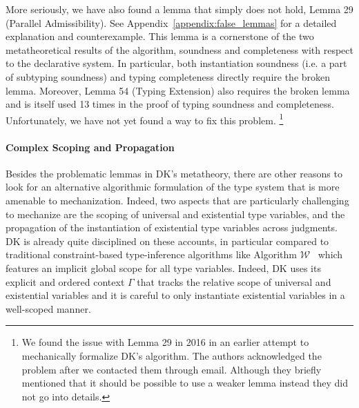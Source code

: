 
More seriously, we have also found a lemma that simply does not hold, 
Lemma 29 (Parallel Admissibility).
See Appendix~\ref{appendix:false_lemmas} for a detailed explanation
and counterexample. This lemma is a cornerstone of the two metatheoretical results 
of the algorithm, soundness and completeness with respect to the declarative system.
In particular, both instantiation soundness (i.e. a part of subtyping
soundness) and typing completeness directly require the broken lemma.
Moreover, Lemma 54 (Typing Extension) also requires the broken lemma and is
itself used 13 times in the proof of typing soundness and completeness.
Unfortunately, we have not yet found a way to fix this problem.
\footnote{We found the issue with Lemma 29 in 2016 in an earlier attempt to mechanically
  formalize DK's algorithm. The authors acknowledged the problem after we contacted them through email.
  Although they briefly mentioned that it should be possible to use a weaker lemma instead they did
  not go into details.
}

\paragraph{Complex Scoping and Propagation}

Besides the problematic lemmas in DK's metatheory, there are other reasons to
look for an alternative algorithmic formulation of the type system that is more
amenable to mechanization. Indeed, two aspects that are particularly
challenging to mechanize are the scoping of universal and existential type
variables, and the propagation of the instantiation of existential type
variables across judgments. 
DK is already quite disciplined on these accounts, in particular compared to
traditional constraint-based type-inference algorithms like Algorithm $\mathcal{W}$~\cite{milner1978theory} which
features an implicit global scope for all type variables. Indeed, DK uses its
explicit and ordered context $\Gamma$ that tracks the relative scope of universal and
existential variables and it is careful to only instantiate existential
variables in a well-scoped manner.

